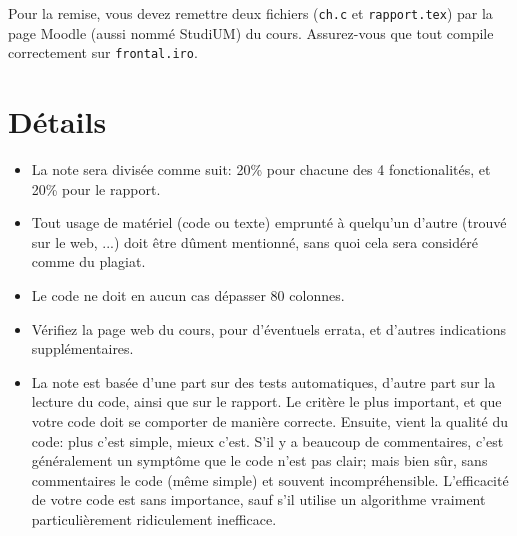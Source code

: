 \documentclass{article}
\begin{document}
Pour la remise, vous devez remettre deux fichiers (\texttt{ch.c} et
\texttt{rapport.tex}) par la page Moodle (aussi nommé StudiUM) du cours.
Assurez-vous que tout compile correctement sur \texttt{frontal.iro}.

\section{Détails}

\begin{itemize}
\item La note sera divisée comme suit: 20\% pour chacune des
  4 fonctionalités, et 20\% pour le rapport.
\item Tout usage de matériel (code ou texte) emprunté à quelqu'un d'autre
  (trouvé sur le web, ...) doit être dûment mentionné, sans quoi cela sera
  considéré comme du plagiat.
\item Le code ne doit en aucun cas dépasser 80 colonnes.
\item Vérifiez la page web du cours, pour d'éventuels errata, et d'autres
  indications supplémentaires.
\item La note est basée d'une part sur des tests automatiques, d'autre part
  sur la lecture du code, ainsi que sur le rapport.  Le critère le plus
  important, et que votre code doit se comporter de manière correcte.
  Ensuite, vient la qualité du code: plus c'est simple, mieux c'est.
  S'il y a beaucoup de commentaires, c'est généralement un symptôme que le
  code n'est pas clair; mais bien sûr, sans commentaires le code (même
  simple) et souvent incompréhensible.  L'efficacité de votre code est sans
  importance, sauf s'il utilise un algorithme vraiment particulièrement
  ridiculement inefficace.
\end{itemize}
\end{document}

